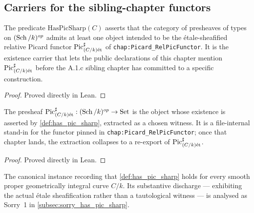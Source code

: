 \subsection{Carriers for the sibling-chapter functors}
\label{subsec:fga_pic_functor_carriers}

\begin{definition}
  \label{def:has_pic_sharp}
  The predicate \(\mathrm{HasPicSharp}(C)\) asserts that the category of presheaves of
  types on \((\operatorname{Sch}/k)^{op}\) admits at least one object intended to be the
  \'etale-sheafified relative Picard functor \(\operatorname{Pic}^\sharp_{(C/k)\mathrm{\acute{e}t}}\) of
  \texttt{chap:Picard_RelPicFunctor}. It is the existence carrier that lets the
  public declarations of this chapter mention \(\operatorname{Pic}^\sharp_{(C/k)\mathrm{\acute{e}t}}\)
  before the A.1.c sibling chapter has committed to a specific construction.
\end{definition}

\begin{proof}
  Proved directly in Lean.
\end{proof}

\begin{definition}
  \label{def:pic_sharp_carrier}
  The presheaf \(\operatorname{Pic}^\sharp_{(C/k)\mathrm{\acute{e}t}} : (\operatorname{Sch}/k)^{op} \to \mathrm{Set}\) is the object whose
  existence is asserted by \cref{def:has_pic_sharp}, extracted as a chosen
  witness. It is a file-internal stand-in for the functor pinned in
  \texttt{chap:Picard_RelPicFunctor}; once that chapter lands, the extraction
  collapses to a re-export of \(\operatorname{Pic}^\sharp_{(C/k)\mathrm{\acute{e}t}}\).
\end{definition}

\begin{proof}
  Proved directly in Lean.
\end{proof}

\begin{definition}
  \label{def:inst_has_pic_sharp}
  The canonical instance recording that \cref{def:has_pic_sharp} holds for
  every smooth proper geometrically integral curve \(C/k\). Its substantive
  discharge --- exhibiting the actual \'etale sheafification rather than a
  tautological witness --- is analysed as Sorry~1 in
  \cref{subsec:sorry_has_pic_sharp}.
\end{definition}

